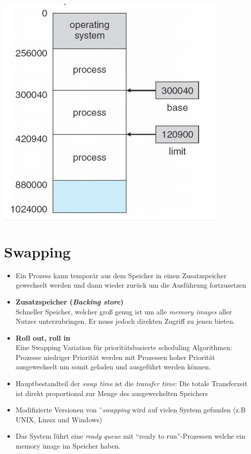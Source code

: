\documentclass[a4paper]{scrreprt}
\begin{document}
\begin{center}
\includegraphics[scale=0.5]{baseandlimitprotection.png}
\end{center}


\section{Swapping}
\begin{itemize}
\item Ein Prozess kann temporär aus dem Speicher in einen Zusatzspeicher gewechselt werden und dann wieder zurück um die Ausführung fortzusetzen
\item \textbf{Zusatzspeicher (\textit{Backing store})} \ \\ Schneller Speicher, welcher groß genug ist um alle \textit{memory images} aller Nutzer unterzubringen. Er muss jedoch direkten Zugriff zu jenen bieten.
\item \textbf{Roll out, roll in} \ \\ Eine Swapping Variation für prioritätsbasierte scheduling Algorithmen: Prozesse niedriger Priorität werden mit Prozessen hoher Priorität ausgewechselt um somit geladen und ausgeführt werden können.
\item Hauptbestandteil der \textit{swap time} ist die \textit{transfer time}: Die totale Transferzeit ist direkt proportional zur Menge des ausgewechelten Speichers
\item Modifizierte Versionen von ˆ\textit{swapping} wird auf vielen System gefunden (z.B UNIX, Linux und Windows)
\item Das System führt eine \textit{ready queue} mit "`ready to run"'-Prozessen welche ein memory image im Speicher haben.

\end{itemize}
\end{document}
